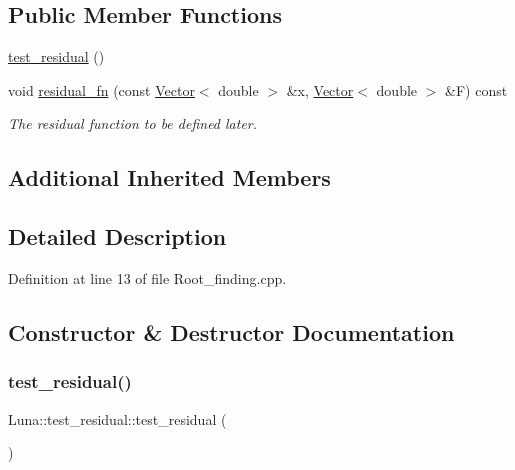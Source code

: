 \subsection*{Public Member Functions}
\begin{DoxyCompactItemize}
\item 
\hyperlink{classLuna_1_1test__residual_a5642e22c7c46d4d0e24fabb55a03e410}{test\+\_\+residual} ()
\item 
void \hyperlink{classLuna_1_1test__residual_abf5e77702d2ffec8bf2ffdc6728a8473}{residual\+\_\+fn} (const \hyperlink{classLuna_1_1Vector}{Vector}$<$ double $>$ \&x, \hyperlink{classLuna_1_1Vector}{Vector}$<$ double $>$ \&F) const
\begin{DoxyCompactList}\small\item\em The residual function to be defined later. \end{DoxyCompactList}\end{DoxyCompactItemize}
\subsection*{Additional Inherited Members}


\subsection{Detailed Description}


Definition at line 13 of file Root\+\_\+finding.\+cpp.



\subsection{Constructor \& Destructor Documentation}
\mbox{\label{classLuna_1_1test__residual_a5642e22c7c46d4d0e24fabb55a03e410}} 
\subsubsection{\texorpdfstring{test\+\_\+residual()}{test\_residual()}}
{\footnotesize\ttfamily Luna\+::test\+\_\+residual\+::test\+\_\+residual (\begin{DoxyParamCaption}{ }\end{DoxyParamCaption})\hspace{0.3cm}{\ttfamily [inline]}}



